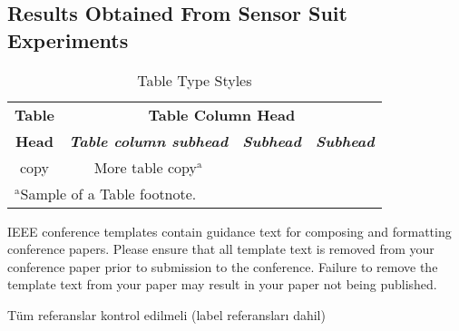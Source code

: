 \documentclass[conference]{IEEEtran}
\begin{document}
\subsection{Results Obtained From Sensor Suit Experiments}

\begin{table}[htbp]
\caption{Table Type Styles}
\begin{center}
\begin{tabular}{|c|c|c|c|}
\hline
\textbf{Table}&\multicolumn{3}{|c|}{\textbf{Table Column Head}} \\
\cline{2-4} 
\textbf{Head} & \textbf{\textit{Table column subhead}}& \textbf{\textit{Subhead}}& \textbf{\textit{Subhead}} \\
\hline
copy& More table copy$^{\mathrm{a}}$& &  \\
\hline
\multicolumn{4}{l}{$^{\mathrm{a}}$Sample of a Table footnote.}
\end{tabular}
\label{tab1}
\end{center}
\end{table}



\vspace{12pt}
\color{red}
IEEE conference templates contain guidance text for composing and formatting conference papers. Please ensure that all template text is removed from your conference paper prior to submission to the conference. Failure to remove the template text from your paper may result in your paper not being published.

\vspace{12pt}
\color{red}
Tüm referanslar kontrol edilmeli (label referansları dahil)
\end{document}
